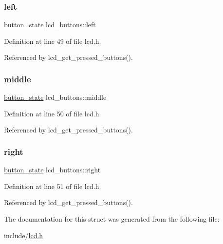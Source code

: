 \subsubsection{\texorpdfstring{left}{left}}
{\footnotesize\ttfamily \hyperlink{lcd_8h_a0bbab92f5605e16a4162b6c5ccc2c29b}{button\+\_\+state} lcd\+\_\+buttons\+::left}



Definition at line 49 of file lcd.\+h.



Referenced by lcd\+\_\+get\+\_\+pressed\+\_\+buttons().

\mbox{\label{structlcd__buttons_a293342810ac56f73979b08f144d6e6b9}} 
\subsubsection{\texorpdfstring{middle}{middle}}
{\footnotesize\ttfamily \hyperlink{lcd_8h_a0bbab92f5605e16a4162b6c5ccc2c29b}{button\+\_\+state} lcd\+\_\+buttons\+::middle}



Definition at line 50 of file lcd.\+h.



Referenced by lcd\+\_\+get\+\_\+pressed\+\_\+buttons().

\mbox{\label{structlcd__buttons_a2437d744e09ca1bb91ab4ca53ef77198}} 
\subsubsection{\texorpdfstring{right}{right}}
{\footnotesize\ttfamily \hyperlink{lcd_8h_a0bbab92f5605e16a4162b6c5ccc2c29b}{button\+\_\+state} lcd\+\_\+buttons\+::right}



Definition at line 51 of file lcd.\+h.



Referenced by lcd\+\_\+get\+\_\+pressed\+\_\+buttons().



The documentation for this struct was generated from the following file\+:\begin{DoxyCompactItemize}
\item 
include/\hyperlink{lcd_8h}{lcd.\+h}\end{DoxyCompactItemize}
